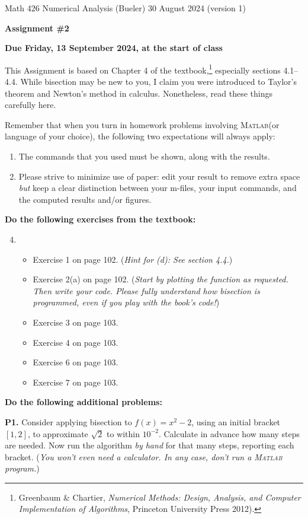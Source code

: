 \documentclass[12pt]{amsart}
\newcommand{\Matlab}{\textsc{Matlab}\xspace}
\begin{document}
\scriptsize \noindent Math 426 Numerical Analysis (Bueler) \hfill 30 August 2024 (version 1)
\normalsize

\medskip\bigskip

\Large\centerline{\textbf{Assignment \#2}}
\large
\bigskip

\centerline{\textbf{Due Friday, 13 September 2024, at the start of class}}
\bigskip
\normalsize

\thispagestyle{empty}

This Assignment is based on Chapter 4 of the textbook,\footnote{Greenbaum \& Chartier, \emph{Numerical Methods: Design, Analysis, and Computer Implementation of Algorithms}, Princeton University Press 2012).}  especially sections 4.1--4.4.  While bisection may be new to you, I claim you were introduced to Taylor's theorem and Newton's method in calculus.  Nonetheless, read these things carefully here.

\bigskip
\noindent Remember that when you turn in homework problems involving \Matlab (or language of your choice), the following two expectations will always apply:
\renewcommand{\labelenumi}{\arabic{enumi}.\,}
\begin{enumerate}
\item The commands that you used must be shown, along with the results.
\item Please strive to minimize use of paper: edit your result to remove extra space \emph{but} keep a clear distinction between your m-files, your input commands, and the computed results and/or figures.
\end{enumerate}

\bigskip\bigskip
\noindent \textbf{Do the following exercises from the textbook:}

\medskip
\renewcommand{\labelenumi}{{\footnotesize\underline{\textsc{Chapter \arabic{enumi}}}}}
\begin{enumerate}
\setcounter{enumi}{3}
\item ~
    \begin{itemize}
    \item Exercise 1 on page 102.  (\emph{Hint for (d): See section 4.4.})
    \item Exercise 2(a) on page 102.  (\emph{Start by plotting the function as requested.  Then write your code.  Please fully understand how bisection is programmed, even if you play with the book's code!})
    \item Exercise 3 on page 103.
    \item Exercise 4 on page 103.
    \item Exercise 6 on page 103.
    \item Exercise 7 on page 103.
    \end{itemize}
\end{enumerate}

\bigskip\bigskip
\noindent \textbf{Do the following additional problems:}

\bigskip
\noindent \textbf{P1.}  Consider applying bisection to $f(x)=x^2-2$, using an initial bracket $[1,2]$, to approximate $\sqrt{2}$ to within $10^{-2}$.  Calculate in advance how many steps are needed.  Now run the algorithm \emph{by hand} for that many steps, reporting each bracket.  (\emph{You won't even need a calculator.  In any case, don't run a \Matlab program.})
\end{document}
